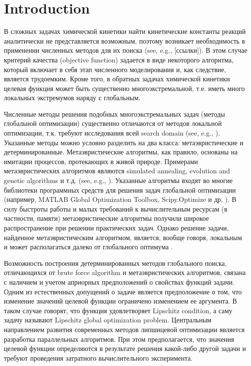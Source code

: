\documentclass[mathematics,article,submit,pdftex,moreauthors]{Definitions/mdpi}
\begin{document}
\section{Introduction}



В сложных задачах химической кинетики найти кинетические константы реакций аналитически не представляется возможным, поэтому возникает необходимость в применении численных методов для их поиска (see, e.g., [ссылки]). В этом случае критерий качества (objective function) задается в виде некоторого алгоритма, который включает в себя этап численного моделирования и, как следствие, является трудоемким. Кроме того, в обратных задачах химической кинетики целевая функция может быть существенно многоэкстремальной, т.е. иметь много локальных экстремумов наряду с глобальным. 

Численные методы решения подобных многоэкстремальных задач (методы глобальной оптимизации) существенно отличаются от методов локальной оптимизации, т.к. требуют исследования всей search domain (see, e.g., \cite{PaulaviciusZilinskas2014,Sergeyev2017}). Указанные методы можно условно разделить на два класса: метаэвристические и детерминированные. Метаэвристические алгоритмы, как правило, основаны на имитации процессов, протекающих в живой природе.
Примерами метаэвристических алгоритмов являются simulated annealing, evolution and genetic algorithms и т.д. (see, e.g., \cite{Battiti2009,Eiben2015}).
Указанные алгоритмы входят во многие библиотеки программных средств для решения задач глобальной оптимизации (например, MATLAB Global Optimization Toolbox, Scipy.Optimize и др. ).
В силу быстроты работы и малых требований к вычислительным ресурсам (в частности, памяти) метаэвристические алгоритмы получили широкое распространение при решении практических задач.  Однако решение задачи, найденное метаэвристическим алгоритмом, является, вообще говоря, локальным и может располагаться далеко от глобального оптимума \cite{Kvasov2018}. 

Возможность построения детерминированных методов глобального поиска, отличающихся от brute force algorithm и метаэвристических алгоритмов, связана с наличием и учетом  априорных предположений о свойствах функций задачи. 
Одним из естественных допущений о задаче является предположение о том, что изменение значений целевой функции ограничено изменением ее аргумента. В таком случае говорят, что функция удовлетворяет Lipschitz condition, а саму задачу называют Lipschitz global optimization problem. Центральным направлением развития современных методов липшицевой оптимизации является разработка параллельных алгоритмов. При этом предполагается, что значения целевой функции определяются в результате решения какой-либо другой задачи и требуют проведения затратного вычислительного эксперимента.
\end{document}

